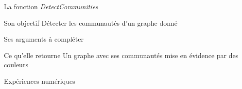 \documentclass[11pt]{beamer}
\begin{document}
	\begin{frame}{La fonction \textit{DetectCommunities}}
		\begin{block}{Son objectif}
			Détecter les communautés d'un graphe donné
		\end{block}	
		\begin{block}{Ses arguments}
			à compléter
		\end{block}
		\begin{block}{Ce qu'elle retourne}
			Un graphe avec ses communautés mise en évidence par des couleurs
		\end{block}                            
	\end{frame}
	
	\begin{frame}{Expériences numériques}
		\begin{figure}[htp] 
			\centering
			\hfill%
		\end{figure}
	\end{frame}
	
\end{document}
